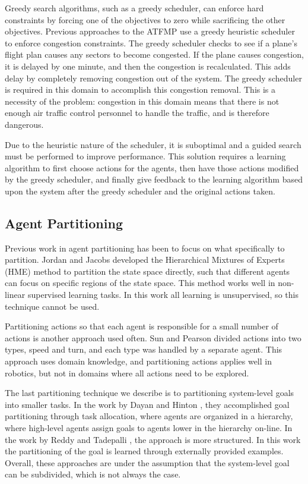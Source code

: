 \documentclass[onehalf,11pt]{beavtex}
\begin{document}
Greedy search algorithms, such as a greedy scheduler, can enforce hard constraints by forcing one of the objectives to zero while sacrificing the other objectives. Previous approaches to the ATFMP use a greedy heuristic scheduler \cite{Rios} to enforce congestion constraints. The greedy scheduler checks to see if a plane's flight plan causes any sectors to become congested. If the plane causes congestion, it is delayed by one minute, and then the congestion is recalculated. This adds delay by completely removing congestion out of the system. The greedy scheduler is required in this domain to accomplish this congestion removal. This is a necessity of the problem: congestion in this domain means that there is not enough air traffic control personnel to handle the traffic, and is therefore dangerous.

Due to the heuristic nature of the scheduler, it is suboptimal and a guided search must be performed to improve performance. This solution requires a learning algorithm to first choose actions for the agents, then have those actions modified by the greedy scheduler, and finally give feedback to the learning algorithm based upon the system after the greedy scheduler and the original actions taken.

\subsection{Agent Partitioning}

Previous work in agent partitioning has been to focus on what specifically to partition. Jordan and Jacobs \cite{716791} developed the Hierarchical Mixtures of Experts (HME) method to partition the state space directly, such that different agents can focus on specific regions of the state space. This method works well in non-linear supervised learning tasks. In this work all learning is unsupervised, so this technique cannot be used.

Partitioning actions so that each agent is responsible for a small number of actions is another approach used often. Sun and Pearson \cite{Sun98someexperiments} divided actions into two types, speed and turn, and each type was handled by a separate agent. This approach uses domain knowledge, and partitioning actions applies well in robotics, but not in domains where all actions need to be explored.

The last partitioning technique we describe is to partitioning system-level goals into smaller tasks. In the work by Dayan and Hinton \cite{Dayan93feudalreinforcement}, they accomplished goal partitioning through task allocation, where agents are organized in a hierarchy, where high-level agents assign goals to agents lower in the hierarchy on-line. In the work by Reddy and Tadepalli \cite{Reddy_learninggoal-decomposition}, the approach is more structured. In this work the partitioning of the goal is learned through externally provided examples. Overall, these approaches are under the assumption that the system-level goal can be subdivided, which is not always the case. 
\end{document}

